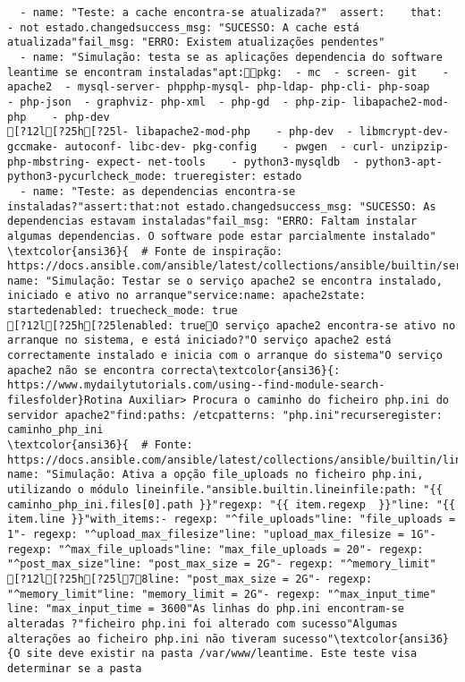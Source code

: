\documentclass{scrartcl}
\begin{document}
\begin{Verbatim}
  - name: "Teste: a cache encontra-se atualizada?"  assert:    that:  - not estado.changedsuccess_msg: "SUCESSO: A cache está atualizada"fail_msg: "ERRO: Existem atualizações pendentes"
  - name: "Simulação: testa se as aplicações dependencia do software leantime se encontram instaladas"apt:pkg:  - mc  - screen- git    - apache2  - mysql-server- phpphp-mysql- php-ldap- php-cli- php-soap    - php-json  - graphviz- php-xml  - php-gd  - php-zip- libapache2-mod-php    - php-dev
[?12l[?25h[?25l- libapache2-mod-php    - php-dev  - libmcrypt-dev- gccmake- autoconf- libc-dev- pkg-config    - pwgen  - curl- unzipzip- php-mbstring- expect- net-tools    - python3-mysqldb  - python3-apt- python3-pycurlcheck_mode: trueregister: estado
  - name: "Teste: as dependencias encontra-se instaladas?"assert:that:not estado.changedsuccess_msg: "SUCESSO: As dependencias estavam instaladas"fail_msg: "ERRO: Faltam instalar algumas dependencias. O software pode estar parcialmente instalado"
\textcolor{ansi36}{  # Fonte de inspiração: https://docs.ansible.com/ansible/latest/collections/ansible/builtin/service_module.html}- name: "Simulação: Testar se o serviço apache2 se encontra instalado, iniciado e ativo no arranque"service:name: apache2state: startedenabled: truecheck_mode: true
[?12l[?25h[?25lenabled: trueO serviço apache2 encontra-se ativo no arranque no sistema, e está iniciado?"O serviço apache2 está correctamente instalado e inicia com o arranque do sistema"O serviço apache2 não se encontra correcta\textcolor{ansi36}{: https://www.mydailytutorials.com/using--find-module-search-filesfolder}Rotina Auxiliar> Procura o caminho do ficheiro php.ini do servidor apache2"find:paths: /etcpatterns: "php.ini"recurseregister: caminho_php_ini
\textcolor{ansi36}{  # Fonte: https://docs.ansible.com/ansible/latest/collections/ansible/builtin/lineinfile_module.html}- name: "Simulação: Ativa a opção file_uploads no ficheiro php.ini, utilizando o módulo lineinfile."ansible.builtin.lineinfile:path: "{{ caminho_php_ini.files[0].path }}"regexp: "{{ item.regexp  }}"line: "{{ item.line }}"with_items:- regexp: "^file_uploads"line: "file_uploads = 1"- regexp: "^upload_max_filesize"line: "upload_max_filesize = 1G"- regexp: "^max_file_uploads"line: "max_file_uploads = 20"- regexp: "^post_max_size"line: "post_max_size = 2G"- regexp: "^memory_limit"
[?12l[?25h[?25l78line: "post_max_size = 2G"- regexp: "^memory_limit"line: "memory_limit = 2G"- regexp: "^max_input_time"  line: "max_input_time = 3600"As linhas do php.ini encontram-se alteradas ?"ficheiro php.ini foi alterado com sucesso"Algumas alterações ao ficheiro php.ini não tiveram sucesso"\textcolor{ansi36}{O site deve existir na pasta /var/www/leantime. Este teste visa determinar se a pasta

\end{Verbatim}
\end{document}
